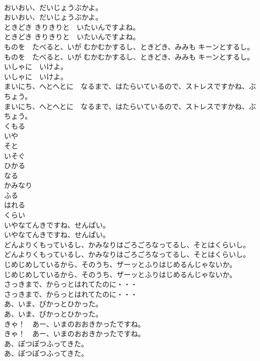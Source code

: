 \documentclass[8pt]{extreport}
\begin{document}
\begin{CJK}{UTF8}{min}
\\	おいおい、だいじょうぶかよ。	
\\	おいおい、だいじょうぶかよ。 
\\	ときどき きりきりと　いたいんですよね。	
\\	ときどき きりきりと　いたいんですよね。 
\\	ものを　たべると、いが むかむかするし、ときどき、みみも キーンとするし。	
\\	ものを　たべると、いが むかむかするし、ときどき、みみも キーンとするし。 
\\	いしゃに　いけよ。	
\\	いしゃに　いけよ。 
\\	まいにち、へとへとに　なるまで、はたらいているので、ストレスですかね、ぶちょう。	
\\	まいにち、へとへとに　なるまで、はたらいているので、ストレスですかね、ぶちょう。 
\\	くもる
\\	いや
\\	そと
\\	いそぐ
\\	ひかる
\\	なる
\\	かみなり
\\	ふる
\\	はれる
\\	くらい
\\	いやなてんきですね、せんぱい。	
\\	いやなてんきですね、せんぱい。 
\\	どんよりくもっているし、かみなりはごろごろなってるし、そとはくらいし。	
\\	どんよりくもっているし、かみなりはごろごろなってるし、そとはくらいし。 
\\	じめじめしているから、そのうち、ザーッとふりはじめるんじゃないか。	
\\	じめじめしているから、そのうち、ザーッとふりはじめるんじゃないか。 
\\	さっきまで、からっとはれてたのに・・・	
\\	さっきまで、からっとはれてたのに・・・ 
\\	あ、いま、ぴかっとひかった。	
\\	あ、いま、ぴかっとひかった。 
\\	きゃ！　あー、いまのおおきかったですね。	
\\	きゃ！　あー、いまのおおきかったですね。 
\\	あ、ぽつぽつふってきた。	
\\	あ、ぽつぽつふってきた。 

\end{CJK}
\end{document}
